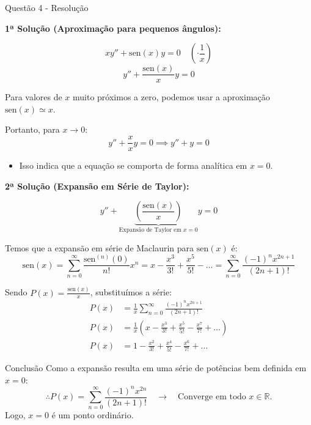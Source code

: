 \documentclass[8pt,aspectratio = 169]{beamer}
\begin{document}
\begin{frame}[allowframebreaks]{Questão 4 - Resolução}
    
    \textbf{1ª Solução (Aproximação para pequenos ângulos):}
    
    \[ xy'' + \text{sen}(x)y = 0 \quad \left(\cdot \frac{1}{x}\right) \]
    \[ y'' + \frac{\text{sen}(x)}{x} y = 0 \]
    
    Para valores de $x$ muito próximos a zero, podemos usar a aproximação $\text{sen}(x) \simeq x$.
    
    Portanto, para $x \to 0$:
    \[ y'' + \frac{x}{x}y = 0 \implies \boxed{y'' + y = 0} \]
    
    \begin{itemize}
        \item Isso indica que a equação se comporta de forma analítica em $x=0$.
    \end{itemize}

    \framebreak 
    
    \textbf{2ª Solução (Expansão em Série de Taylor):}
    
    \[ y'' + \underbrace{\left( \frac{\text{sen}(x)}{x} \right)}_{\text{Expansão de Taylor em } x=0} y = 0 \]
    
    Temos que a expansão em série de Maclaurin para $\text{sen}(x)$ é:
    \[ \text{sen}(x) = \sum_{n=0}^{\infty} \frac{\text{sen}^{(n)}(0)}{n!} x^n = x - \frac{x^3}{3!} + \frac{x^5}{5!} - \dots = \sum_{n=0}^{\infty} \frac{(-1)^n x^{2n+1}}{(2n+1)!} \]
    
    Sendo $P(x) = \frac{\text{sen}(x)}{x}$, substituímos a série:
    \begin{align*}
        P(x) &= \frac{1}{x} \sum_{n=0}^{\infty} \frac{(-1)^n x^{2n+1}}{(2n+1)!} \\[1ex]
        P(x) &= \frac{1}{x} \left( x - \frac{x^3}{3!} + \frac{x^5}{5!} - \frac{x^7}{7!} + \dots \right) \\[1ex]
        P(x) &= 1 - \frac{x^2}{3!} + \frac{x^4}{5!} - \frac{x^6}{7!} + \dots 
    \end{align*}
    
    \framebreak 
    

    \begin{block}{Conclusão}
        Como a expansão resulta em uma série de potências bem definida em $x=0$:
        \[ \therefore P(x) = \sum_{n=0}^{\infty} \frac{(-1)^n x^{2n}}{(2n+1)!} \quad \longrightarrow \quad \text{Converge em todo } x \in \mathbb{R}. \]
        Logo, $x=0$ é um ponto ordinário.
    \end{block}
    
\end{frame}
\end{document}
